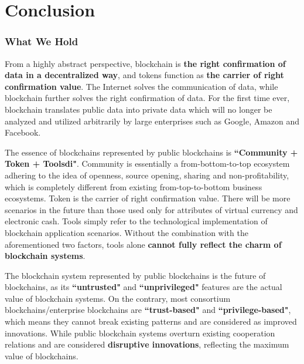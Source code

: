 \section{Conclusion}
\label{sec:conclusion}

\subsubsection*{What We Hold}

From a highly abstract perspective, blockchain is \textbf{the right confirmation of data in a decentralized way}, and tokens function as \textbf{the carrier of right confirmation value}. The Internet solves the communication of data, while blockchain further solves the right confirmation of data. For the first time ever, blockchain translates public data into private data which will no longer be analyzed and utilized arbitrarily by large enterprises such as Google, Amazon and Facebook.


The essence of blockchains represented by public blockchains is \textbf{``Community + Token + Toolsdi"}. Community is essentially a from-bottom-to-top ecosystem adhering to the idea of openness, source opening, sharing and non-profitability, which is completely different from existing from-top-to-bottom business ecosystems. Token is the carrier of right confirmation value. There will be more scenarios in the future than those used only for attributes of virtual currency and electronic cash. Tools simply refer to the technological implementation of blockchain application scenarios. Without the combination with the aforementioned two factors, tools alone \textbf{cannot fully reflect the charm of blockchain systems}.


The blockchain system represented by public blockchains is the future of blockchains, as its \textbf{``untrusted"} and \textbf{``unprivileged"} features are the actual value of blockchain systems. On the contrary, most consortium blockchains/enterprise blockchains are \textbf{``trust-based"} and \textbf{``privilege-based"}, which means they cannot break existing patterns and are considered as improved innovations. While public blockchain systems overturn existing cooperation relations and are considered \textbf{disruptive innovations}, reflecting the maximum value of blockchains.

